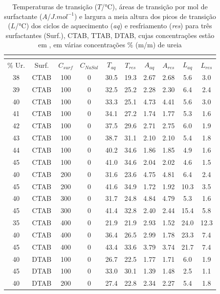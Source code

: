 		\begin{longtable}[h]{cccccccccc}
			\caption{Temperaturas de transição ($T$/°C), áreas de transição por mol de surfactante ($A$/$J.mol^{-1}$) e largura a meia altura dos picos de transição ($L$/°C) dos ciclos de aquecimento (\emph{aq}) e resfriamento (\emph{res}) para três surfactantes (Surf.), CTAB, TTAB, DTAB, cujas concentrações estão em \mM, em várias concentrações \% (m/m) de ureia}\\
            \label{tab:DSC_temp_areas}\\
			\toprule
			\centering
			\% Ur. & Surf. & $C_{surf}$ & $C_{NaSal}$ &
			$T_{aq}$ & $T_{res}$ & $A_{aq}$ & $A_{res}$ & $L_{aq}$ & $L_{res}$\\
			\midrule
			\endhead
			38 & CTAB & 100 & 0 & 30.5 & 19.3 & 2.67 & 2.68 & 5.6 &	3.0\\*
			39 & CTAB & 100 & 0 & 32.5 & 25.2 & 2.28 & 2.30 & 6.4 &	2.4\\*
			40 & CTAB & 100 & 0 & 33.3 & 25.1 & 4.73 & 4.41 & 5.6 &	3.0\\*
			41 & CTAB & 100 & 0 & 34.1 & 27.2 & 1.74 & 1.77 & 5.3 &	1.6\\*
			42 & CTAB & 100 & 0 & 37.5 & 29.6 & 2.71 & 2.75 & 6.0 &	1.9\\*
			43 & CTAB & 100 & 0 & 38.7 & 31.1 & 2.10 & 2.10 & 5.4 &	1.8\\
			44 & CTAB & 100 & 0 & 40.2 & 34.6 & 1.86 & 1.85 & 4.9 &	1.6\\
			45 & CTAB & 100 & 0 & 41.0 & 34.6 & 2.04 & 2.02 & 4.6 &	1.5\\
			40 & CTAB & 200 & 0 & 31.6 & 23.6 & 4.75 & 4.81 & 6.4 &	2.4\\
			45 & CTAB & 200 & 0 & 41.6 & 34.9 & 1.72 & 1.92 & 10.3 & 3.5\\
			40 & CTAB & 300 & 0 & 31.7 & 24.8 & 4.84 & 4.79 & 5.3 &	1.6\\
			45 & CTAB & 300 & 0 & 41.4 & 32.8 & 2.40 & 2.44 & 15.4 & 5.8\\
			35 & CTAB & 400 & 0 & 21.9 & 21.9 & 2.93 & 1.52 & 24.0 & 12.3\\
			40 & CTAB & 400 & 0 & 36.4 & 26.5 & 2.99 & 1.78 & 23.3 & 7.4\\
			45 & CTAB & 400 & 0 & 43.4 & 33.6 & 3.79 & 3.74 & 21.7 & 7.4\\
			\midrule
			40 & DTAB & 100 & 0 & 26.7 & 22.5 & 1.77 & 1.71 & 6.0 & 1.9\\
			45 & DTAB & 100 & 0 & 33.0 & 30.1 & 1.39 & 1.48 & 2.5 & 1.1\\
			40 & DTAB & 200 & 0 & 27.4 & 22.8 & 2.34 & 2.27 & 5.4 &	1.8\\

\end{longtable}
